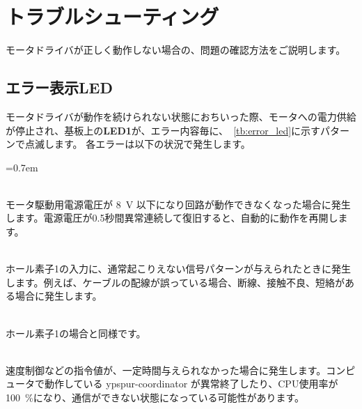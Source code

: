 \documentclass[11pt,a4j,openany]{jbook}
\newcommand{\percent}{\%}
\begin{document}
\newpage
\section{トラブルシューティング}
\label{sec:トラブルシューティング}

モータドライバが正しく動作しない場合の、問題の確認方法をご説明します。

\subsection{エラー表示LED}

モータドライバが動作を続けられない状態におちいった際、モータへの電力供給が停止され、基板上の{\bf LED1}が、エラー内容毎に、\tablename~\ref{tb:error_led}に示すパターンで点滅します。
各エラーは以下の状況で発生します。

\begin{description}
\itemsep=0.7em
\item [駆動電圧低下]\mbox{}\\
	モータ駆動用電源電圧が 8~V 以下になり回路が動作できなくなった場合に発生します。電源電圧が0.5秒間異常連続して復旧すると、自動的に動作を再開します。

\item [ホール素子1異常]\mbox{}\\
	ホール素子1の入力に、通常起こりえない信号パターンが与えられたときに発生します。例えば、ケーブルの配線が誤っている場合、断線、接触不良、短絡がある場合に発生します。

\item [ホール素子2異常]\mbox{}\\
	ホール素子1の場合と同様です。

\item [通信なし]\mbox{}\\
	速度制御などの指令値が、一定時間与えられなかった場合に発生します。コンピュータで動作している ypspur-coordinator が異常終了したり、CPU使用率が 100~\percent になり、通信ができない状態になっている可能性があります。

\end{description}
\end{document}
